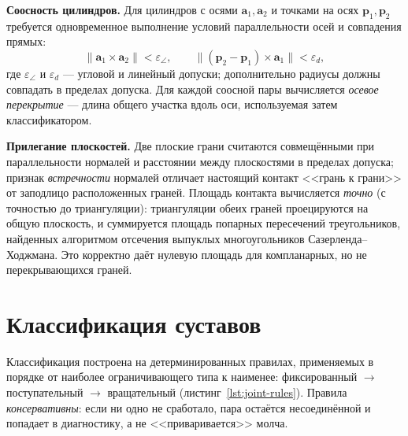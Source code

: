 \textbf{Соосность цилиндров.} Для цилиндров с осями $\mathbf{a}_1,\mathbf{a}_2$
и точками на осях $\mathbf{p}_1,\mathbf{p}_2$ требуется одновременное
выполнение условий параллельности осей и совпадения прямых:
\begin{equation}
  \lVert \mathbf{a}_1 \times \mathbf{a}_2 \rVert < \varepsilon_{\angle},
  \qquad
  \bigl\lVert (\mathbf{p}_2 - \mathbf{p}_1) \times \mathbf{a}_1 \bigr\rVert
  < \varepsilon_{d},
  \label{eq:coaxial}
\end{equation}
где $\varepsilon_{\angle}$ и $\varepsilon_{d}$ --- угловой и линейный допуски;
дополнительно радиусы должны совпадать в пределах допуска. Для каждой соосной
пары вычисляется \emph{осевое перекрытие} --- длина общего участка вдоль оси,
используемая затем классификатором.

\textbf{Прилегание плоскостей.} Две плоские грани считаются совмещёнными при
параллельности нормалей и расстоянии между плоскостями в пределах допуска;
признак \emph{встречности} нормалей отличает настоящий контакт <<грань к
грани>> от заподлицо расположенных граней. Площадь контакта вычисляется
\emph{точно} (с точностью до триангуляции): триангуляции обеих граней
проецируются на общую плоскость, и суммируется площадь попарных пересечений
треугольников, найденных алгоритмом отсечения выпуклых многоугольников
Сазерленда--Ходжмана. Это корректно даёт нулевую площадь для компланарных, но
не перекрывающихся граней.

\section{Классификация суставов}

Классификация построена на детерминированных правилах, применяемых в порядке
от наиболее ограничивающего типа к наименее: фиксированный $\rightarrow$
поступательный $\rightarrow$ вращательный (листинг~\ref{lst:joint-rules}).
Правила \emph{консервативны}: если ни одно не сработало, пара остаётся
несоединённой и попадает в диагностику, а не <<приваривается>> молча.

